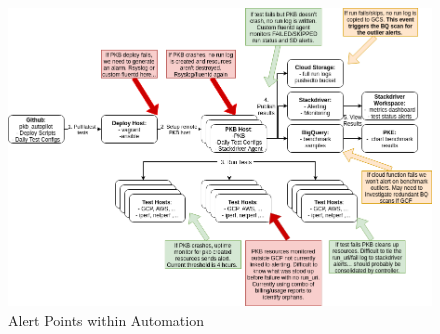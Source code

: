 


\begin{figure}[ht]
\centering
\includegraphics[width=.75\textwidth]{resource/img/ch_benchmarking/alert_points.png}
\caption{Alert Points within Automation }
\label{fig:smaas:alert_points}
\end{figure} 